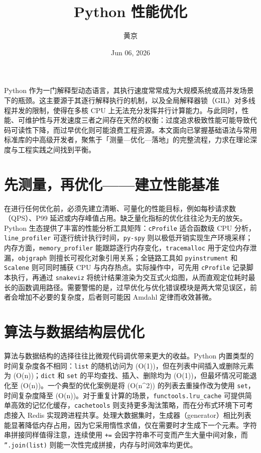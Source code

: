 \title{Python 性能优化}
\author{黄京}
\date{Jun 06, 2026}
\maketitle
Python 作为一门解释型动态语言，其执行速度常常成为大规模系统或高并发场景下的瓶颈。这主要源于其逐行解释执行的机制，以及全局解释器锁（GIL）对多线程并发的限制，使得在多核 CPU 上无法充分发挥并行计算能力。与此同时，性能、可维护性与开发速度三者之间存在天然的权衡：过度追求极致性能可能导致代码可读性下降，而过早优化则可能浪费工程资源。本文面向已掌握基础语法与常用标准库的中高级开发者，聚焦于「测量—优化—落地」的完整流程，力求在理论深度与工程实践之间找到平衡。\par
\chapter{先测量，再优化——建立性能基准}
在进行任何优化前，必须先建立清晰、可量化的性能目标，例如每秒请求数（QPS）、P99 延迟或内存峰值占用。缺乏量化指标的优化往往沦为无的放矢。Python 生态提供了丰富的性能分析工具矩阵：\texttt{cProfile} 适合函数级 CPU 分析，\texttt{line\_{}profiler} 可逐行统计执行时间，\texttt{py-spy} 则以极低开销实现生产环境采样；内存方面，\texttt{memory\_{}profiler} 能跟踪逐行内存变化，\texttt{tracemalloc} 用于定位内存泄漏，\texttt{objgraph} 则擅长可视化对象引用关系；全链路工具如 \texttt{pyinstrument} 和 \texttt{Scalene} 则可同时捕获 CPU 与内存热点。实际操作中，可先用 \texttt{cProfile} 记录脚本执行，再通过 \texttt{snakeviz} 将统计结果渲染为交互式火焰图，从而直观定位耗时最长的函数调用路径。需要警惕的是，过早优化与优化错误模块是两大常见误区，前者会增加不必要的复杂度，后者则可能因 Amdahl 定律而收效甚微。\par
\chapter{算法与数据结构层优化}
算法与数据结构的选择往往比微观代码调优带来更大的收益。Python 内置类型的时间复杂度各不相同：\texttt{list} 的随机访问为 (O(1))，但在列表中间插入或删除元素为 (O(n))；\texttt{dict} 和 \texttt{set} 的平均查找、插入、删除均为 (O(1))，但最坏情况可能退化至 (O(n))。一个典型的优化案例是将 (O(n\^{}2)) 的列表去重操作改为使用 \texttt{set}，时间复杂度降至 (O(n))。对于重复计算的场景，\texttt{functools.lru\_{}cache} 可提供简单高效的记忆化缓存，\texttt{cachetools} 则支持更多淘汰策略，而在分布式环境下可考虑接入 Redis 实现跨进程共享。处理大数据集时，生成器（generator）相比列表能显著降低内存占用，因为它采用惰性求值，仅在需要时才生成下一个元素。字符串拼接同样值得注意，连续使用 \texttt{+=} 会因字符串不可变而产生大量中间对象，而 \texttt{''.join(list)} 则能一次性完成拼接，内存与时间效率均更优。\par
